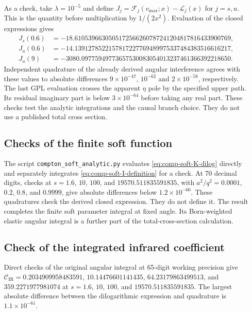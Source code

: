 As a check, take $\lambda=10^{-5}$ and define
$J_j=\mathcal F_j(v_{\max};x)-\mathcal L_j(x)$ for $j=s,u$.
This is the quantity before multiplication by $1/(2x^2)$. Evaluation of the closed expressions gives
\begin{align}
 J_s(0.6)&=-18.6105396630505172566260787241204817816433900769,\\
 J_u(0.6)&=-14.1391278522157817227769489975337484383516616217,\\
 J_u(9)&=-3080.09775949773657530083054013237461366392218650.
\end{align}
Independent quadrature of the already derived angular interference
agrees with these values to absolute differences
$9\times10^{-47}$, $10^{-62}$ and $2\times10^{-58}$,
respectively. The last GPL evaluation crosses the apparent
$\eta$ pole by the specified upper path. Its residual imaginary
part is below $3\times10^{-64}$ before taking any real part.
These checks test the analytic integrations and the causal branch
choice. They do not use a published total cross section.

\subsection{Checks of the finite soft function}
The script \texttt{compton\_soft\_analytic.py} evaluates
\eqref{eq:comp-soft-K-dilog} directly and separately integrates
\eqref{eq:comp-soft-I-definition} for a check. At 70 decimal digits,
checks at $s=1.6$, $10$, $100$, and $19570.511835591835$, with
$a^2/q^2=0.0001$, $0.2$, $0.8$, and $0.9999$, give absolute differences below
$1.2\times10^{-66}$. These quadratures check the derived closed expression.
They do not define it. The result completes the finite soft parameter
integral at fixed angle. Its Born-weighted elastic angular integral
is a further part of the total-cross-section calculation.

\subsection{Check of the integrated infrared coefficient}
Direct checks of the
original angular integral at 65-digit working precision give
$\mathcal C_{\mathrm{IR}}=0.2034909958483591$, $10.14476601141435$,
$64.23179863499513$, and $359.2271977981074$ at $s=1.6$, $10$, $100$, and $19570.511835591835$. The largest absolute difference between the dilogarithmic
expression and quadrature is $1.1\times10^{-61}$.

